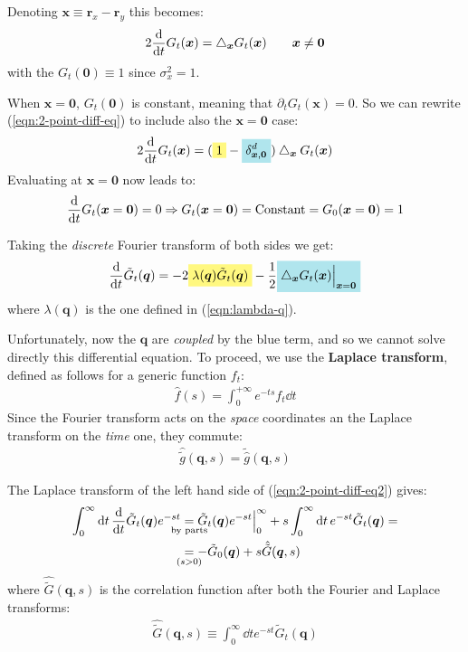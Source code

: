 \documentclass[../../main.tex]{subfiles}
\begin{document}
Denoting $\bm{x} \equiv \bm{r}_x - \bm{r}_y$ this becomes:
\begin{align}\label{eqn:2-point-diff-eq}
    2 \dv{t} G_t(\bm{x}) = \bigtriangleup_{\bm{x}} G_t(\bm{x}) \qquad \bm{x} \neq \bm{0}
\end{align}
with the  $G_t(\bm{0}) \equiv 1$ since $\sigma_x^2 = 1$.

\medskip

When $\bm{x}=\bm{0}$, $G_t(\bm{0})$ is constant, meaning that $\partial_t G_t(\bm{x}) = 0$. So we can rewrite (\ref{eqn:2-point-diff-eq}) to include also the $\bm{x}=\bm{0}$ case:
\begin{align*}
    2 \dv{t} G_t(\bm{x}) = (\hlc{Yellow}{1} - \hlc{SkyBlue}{\delta^d_{\bm{x},\bm{0}}}) \bigtriangleup_{\bm{x}} G_t(\bm{x})
\end{align*}
Evaluating at $\bm{x} = \bm{0}$ now leads to:
\begin{align*}
    \dv{t} G_t(\bm{x}=\bm{0}) = 0 \Rightarrow G_t(\bm{x}=\bm{0}) = \text{Constant} = G_0(\bm{x}=\bm{0}) = 1
\end{align*}

Taking the \textit{discrete} Fourier transform of both sides we get:
\begin{align}\label{eqn:2-point-diff-eq2}
    \dv{t} \tilde{G}_t(\bm{q}) = - 2\hlc{Yellow}{ \lambda(\bm{q}) \tilde{G}_t(\bm{q})} - \frac{1}{2} \hlc{SkyBlue}{\bigtriangleup_{\bm{x}} G_t(\bm{x})\Big|_{\bm{x}=\bm{0}}} 
\end{align} 
where $\lambda(\bm{q})$ is the one defined in (\ref{eqn:lambda-q}).

Unfortunately, now the $\bm{q}$ are \textit{coupled} by the blue term, and so we cannot solve directly this differential equation. To proceed, we use the \textbf{Laplace transform}, defined as follows for a generic function $f_t$:
\begin{align}\label{eqn:laplace-transform}
    \hat{f}(s) = \int_0^{+\infty} e^{-ts} f_t \dd{t} 
\end{align} 
Since the Fourier transform acts on the \textit{space} coordinates an the Laplace transform on the \textit{time} one, they commute:
\begin{align*}
    \hat{\tilde{g}}(\bm{q},s) = \tilde{\hat{g}}(\bm{q},s)
\end{align*}  

The Laplace transform of the left hand side of (\ref{eqn:2-point-diff-eq2}) gives:
\begin{align*}
    \int_0^\infty \dd{t} \dv{t} \tilde{G}_t(\bm{q}) e^{-st} &\underset{\mathclap{\text{by parts}}}{=} \tilde{G}_t(\bm{q}) e^{-s t}\Big|_{0}^\infty + s \int_0^\infty \dd{t} e^{-st} \tilde{G}_t(\bm{q}) =\\
    &\underset{\mathclap{(s > 0)}}{=} -\tilde{G}_0(\bm{q}) + s \hat{\tilde{G}}(\bm{q},s)
\end{align*}
where $\hat{\tilde{G}}(\bm{q},s)$ is the correlation function after both the Fourier and Laplace transforms:
\begin{align*}
    \hat{\tilde{G}}(\bm{q},s) \equiv \int_0^\infty \dd{t} e^{-st} \tilde{G}_t (\bm{q})
\end{align*}
\end{document}
